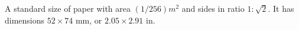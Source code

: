 A standard size of paper with area $(1/256)m^{2}$  and sides in ratio
$ 1 : \sqrt{2}$. It has dimensions $52 \times 74$ mm, or $2.05 \times 2.91$ in.